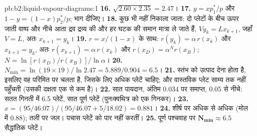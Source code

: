 \begin{solution}{pb:b2:liquid-vapour-diagrams:1}
\textbf{16.} $\sqrt{2.60 \times 2.35} = 2.47$।
\textbf{17.} $y = xp_1^*/p$ और $1 - y = (1 - x)p_2^*/p$; भाग दीजिए।
\textbf{18.} कुछ भी नहीं निकाला जाता: दो प्लेटों के बीच ऊपर जाती वाष्प और
नीचे आता द्रव द्रव्य की और हर घटक की समान मात्रा ले जाते हैं,
$V y_k = L x_{k+1}$, जहाँ $V = L$, अतः $x_{k+1} = y_k$।
\textbf{19.} $r = x/(1 - x)$ के साथ: $r(y_k) = \alpha\,r(x_k)$ और $x_{k+1} = y_k$, अतः
$r(x_{k+1}) = \alpha\,r(x_k)$ और $r(x_D) = \alpha^N r(x_B)$; $N = \ln[r(x_D)/
r(x_B)]/\ln\alpha$।
\textbf{20.} $N_{\min} = \ln(19 \times 19)/\ln 2.47 = 5.889/0.904 = 6.5$।
\textbf{21.} स्तंभ को उत्पाद देना होता है, इसलिए वह परिमित  पर चलता है,
जिसके लिए अधिक प्लेटें चाहिए; और वास्तविक प्लेट साम्य तक नहीं पहुँचती (उसकी
दक्षता एक से कम है)।
\textbf{22.} सात पायदान, अंतिम 0.034 पर समाप्त, 0.05 से नीचे: सतत गिनती में 6.5
प्लेटें, सात पूर्ण प्लेटें (पुनःक्वथित्र को एक गिनकर)।
\textbf{23.} $x = (95/46.07)/(95/46.07 + 5/18.02) = 0.881$।
\textbf{24.} शीर्ष पर अधिक से अधिक  (मोल में 0.88); तली पर
जल। पचास प्लेटें  को पार नहीं करतीं।
\textbf{25.} पूर्ण पश्चवाह पर $\boldsymbol{N_{\min} \approx 6.5}$ सैद्धांतिक
प्लेटें।
\end{solution}
